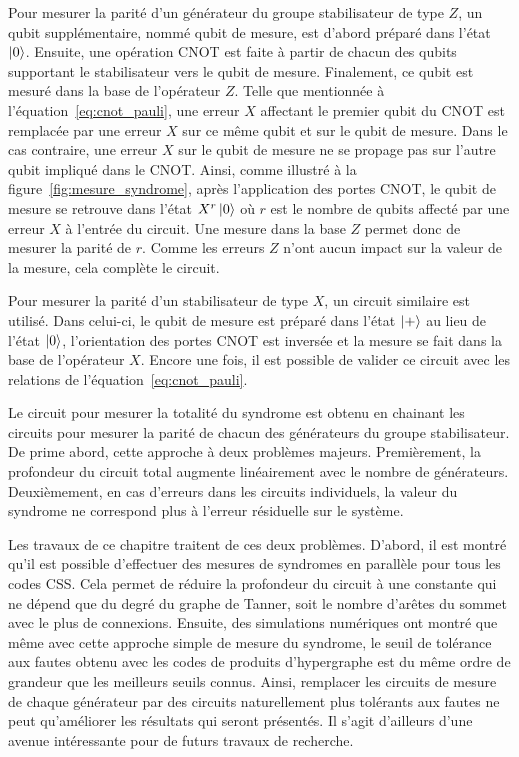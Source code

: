 Pour mesurer la parité d'un générateur du groupe stabilisateur de type $Z$,
un qubit supplémentaire, nommé qubit de mesure,
est d'abord préparé dans l'état $\ket 0$.
Ensuite,
une opération CNOT est faite à partir de chacun des qubits supportant le stabilisateur
vers le qubit de mesure.
Finalement,
ce qubit est mesuré dans la base de l'opérateur $Z$.
Telle que mentionnée à l'équation~\ref{eq:cnot_pauli},
une erreur $X$ affectant le premier qubit du CNOT est remplacée
par une erreur $X$ sur ce même qubit et sur le qubit de mesure.
Dans le cas contraire,
une erreur $X$ sur le qubit de mesure ne se propage pas sur l'autre qubit 
impliqué dans le CNOT.
Ainsi,
comme illustré à la figure~\ref{fig:mesure_syndrome},
après l'application des portes CNOT,
le qubit de mesure se retrouve dans l'état $X^r\ket{0}$ où 
$r$ est le nombre de qubits affecté par une erreur $X$ à l'entrée du circuit.
Une mesure dans la base $Z$ permet donc de mesurer la parité de $r$.
Comme les erreurs $Z$ n'ont aucun impact sur la valeur de la mesure,
cela complète le circuit.

Pour mesurer la parité d'un stabilisateur de type $X$,
un circuit similaire est utilisé.
Dans celui-ci,
le qubit de mesure est préparé dans l'état $\ket +$ au lieu de l'état $\ket 0$,
l'orientation des portes CNOT est inversée
et la mesure se fait dans la base de l'opérateur $X$.
Encore une fois,
il est possible de valider ce circuit avec les relations de l'équation~\ref{eq:cnot_pauli}.

Le circuit pour mesurer la totalité du syndrome est obtenu 
en chainant les circuits pour mesurer la parité de chacun des
générateurs du groupe stabilisateur.
De prime abord,
cette approche à deux problèmes majeurs.
Premièrement,
la profondeur du circuit total augmente linéairement avec le nombre 
de générateurs.
Deuxièmement,
en cas d'erreurs dans les circuits individuels,
la valeur du syndrome ne correspond plus à l'erreur résiduelle sur le système.

Les travaux de ce chapitre traitent de ces deux problèmes.
D'abord,
il est montré qu'il est possible d'effectuer des mesures de syndromes en parallèle
pour tous les codes CSS.
Cela permet de réduire la profondeur du circuit à une constante qui ne dépend que
du degré du graphe de Tanner,
soit le nombre d'arêtes du sommet avec le plus de connexions.
Ensuite,
des simulations numériques ont montré que même avec cette approche simple
de mesure du syndrome,
le seuil de tolérance aux fautes obtenu avec les codes de produits d'hypergraphe
est du même ordre de grandeur que les meilleurs seuils connus.
Ainsi,
remplacer les circuits de mesure de chaque générateur par des circuits
naturellement plus tolérants aux fautes ne peut qu'améliorer les résultats qui seront présentés.
Il s'agit d'ailleurs d'une avenue intéressante pour de futurs travaux de recherche.

